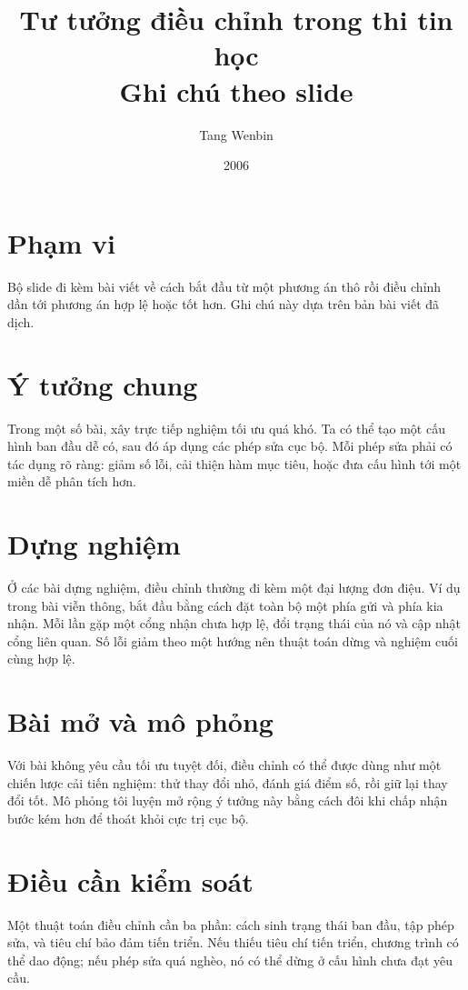 \documentclass[11pt]{article}
\title{Tư tưởng điều chỉnh trong thi tin học\\{\large Ghi chú theo slide}}
\author{Tang Wenbin}
\date{2006}
\begin{document}
\maketitle


\section{Phạm vi}

Bộ slide đi kèm bài viết về cách bắt đầu từ một phương án thô rồi điều chỉnh
dần tới phương án hợp lệ hoặc tốt hơn. Ghi chú này dựa trên bản bài viết đã
dịch.

\section{Ý tưởng chung}

Trong một số bài, xây trực tiếp nghiệm tối ưu quá khó. Ta có thể tạo một cấu
hình ban đầu dễ có, sau đó áp dụng các phép sửa cục bộ. Mỗi phép sửa phải có
tác dụng rõ ràng: giảm số lỗi, cải thiện hàm mục tiêu, hoặc đưa cấu hình tới
một miền dễ phân tích hơn.

\section{Dựng nghiệm}

Ở các bài dựng nghiệm, điều chỉnh thường đi kèm một đại lượng đơn điệu. Ví dụ
trong bài viễn thông, bắt đầu bằng cách đặt toàn bộ một phía gửi và phía kia
nhận. Mỗi lần gặp một cổng nhận chưa hợp lệ, đổi trạng thái của nó và cập
nhật cổng liên quan. Số lỗi giảm theo một hướng nên thuật toán dừng và nghiệm
cuối cùng hợp lệ.

\section{Bài mở và mô phỏng}

Với bài không yêu cầu tối ưu tuyệt đối, điều chỉnh có thể được dùng như một
chiến lược cải tiến nghiệm: thử thay đổi nhỏ, đánh giá điểm số, rồi giữ lại
thay đổi tốt. Mô phỏng tôi luyện mở rộng ý tưởng này bằng cách đôi khi chấp
nhận bước kém hơn để thoát khỏi cực trị cục bộ.

\section{Điều cần kiểm soát}

Một thuật toán điều chỉnh cần ba phần: cách sinh trạng thái ban đầu, tập phép
sửa, và tiêu chí bảo đảm tiến triển. Nếu thiếu tiêu chí tiến triển, chương
trình có thể dao động; nếu phép sửa quá nghèo, nó có thể dừng ở cấu hình chưa
đạt yêu cầu.
\end{document}

